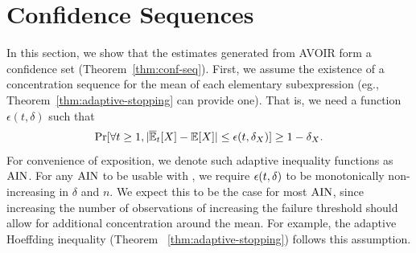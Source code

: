 \section{Confidence Sequences}
\label{sec:appendix:confseq}
In this section, we show that the estimates generated from AVOIR form a confidence set (Theorem~\ref{thm:conf-seq}).
First, we assume the existence of a concentration sequence for the mean of each elementary subexpression (eg., Theorem~\ref{thm:adaptive-stopping} can provide one). 
That is, we need a function $\epsilon(t, \delta)$ such that
\begin{equation}
    \Pr[\forall t \geq 1, |\overline{\mathbb{E}}_t[X] - \mathbb{E}[X]| \leq \epsilon(t, \delta_X)] \geq 1 - \delta_X.
    \label{eqn:conf-seq:elementary:assumed}
\end{equation}
For convenience of exposition, we denote such adaptive inequality functions as $\rm{AIN}$.
For any $\rm{AIN}$ to be usable with \AVOIRmethodname{}, we require ${\epsilon}(t, \delta)$ to be monotonically non-increasing in $\delta$ and $n$. 
We expect this to be the case for most $\rm{AIN}$, since increasing the number of observations of increasing the failure threshold should allow for additional concentration around the mean.
For example, the adaptive Hoeffding inequality (Theorem ~\ref{thm:adaptive-stopping}) follows this assumption.

